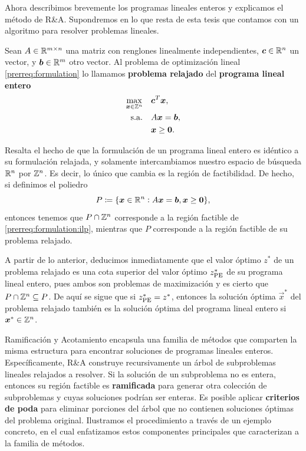 Ahora describimos brevemente los programas lineales enteros y explicamos el método de R\&A.
Supondremos en lo que resta de esta tesis que contamos con un algoritmo para resolver problemas
lineales.
\begin{definition}
	Sean $A \in \mathbb{R}^{m \times n}$ una matriz con renglones linealmente independientes, $\boldsymbol{c} \in
	\mathbb{R}^n$ un vector, y $\boldsymbol{b} \in \mathbb{R}^m$ otro vector. Al problema de optimización lineal
	\eqref{prerreq:formulation} lo llamamos \textbf{problema relajado} del \textbf{programa lineal
	entero}
	\begin{subequations}
		\label{prerreq:formulation:ilp}
		\begin{align}
			\max_{\boldsymbol{x} \in \mathbb{Z}^n} \quad
				& \boldsymbol{c}^T\boldsymbol{x}, \label{prerreq:formulation:objective:ilp} \\
			\text{s.a.} \quad
				& A\boldsymbol{x} = \boldsymbol{b}, \label{prerreq:formulation:constraints:ilp} \\
				& \boldsymbol{x} \geq \boldsymbol{0} \nonumber.
		\end{align}
	\end{subequations}
\end{definition}
Resalta el hecho de que la formulación de un programa lineal entero es idéntico a su formulación
relajada, y solamente intercambiamos nuestro espacio de búsqueda $\mathbb{R}^n$ por $\mathbb{Z}^n$. Es decir, lo único
que cambia es la región de factibilidad. De hecho, si definimos el poliedro
\begin{equation*}
	P \coloneq \lbrace \boldsymbol{x} \in \mathbb{R}^n \vcentcolon A\boldsymbol{x} = \boldsymbol{b}, \boldsymbol{x} \geq \boldsymbol{0} \rbrace,
\end{equation*}
entonces tenemos que $P \cap \mathbb{Z}^n$ corresponde a la región factible de
\eqref{prerreq:formulation:ilp}, mientras que $P$ corresponde a la región factible de su problema
relajado.

A partir de lo anterior, deducimos inmediatamente que el valor óptimo $z^*$ de un problema relajado
es una cota superior del valor óptimo $z^*_{\text{PE}}$ de su programa lineal entero, pues ambos son
problemas de maximización y es cierto que $P \cap \mathbb{Z}^n \subseteq P$. De aquí se sigue que si
$z^*_{\text{PE}} = z^*$, entonces la solución óptima $\vec{x}^*$ del problema relajado también es la
solución óptima del programa lineal entero si $\boldsymbol{x}^* \in \mathbb{Z}^n$.

Ramificación y Acotamiento encapsula una familia de métodos que comparten la misma estructura para
encontrar soluciones de programas lineales enteros. Específicamente, R\&A construye recursivamente
un árbol de subproblemas lineales relajados a resolver. Si la solución de un subproblema no es entera,
entonces su región factible es \textbf{ramificada} para generar otra colección de subproblemas y
cuyas soluciones podrían ser enteras. Es posible aplicar \textbf{criterios de poda} para eliminar
porciones del árbol que no contienen soluciones óptimas del problema original. Ilustramos el
procedimiento a través de un ejemplo concreto, en el cual enfatizamos estos componentes principales
que caracterizan a la familia de métodos.

